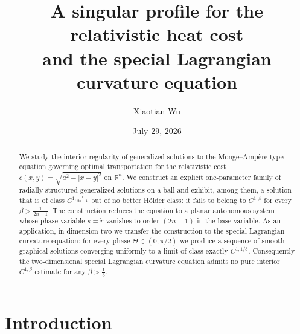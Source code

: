 \documentclass[12pt,letterpaper]{amsart}
\title[]{A singular profile for the relativistic heat cost\\ and the special Lagrangian curvature equation}
\author{Xiaotian Wu}
\date{July 29, 2026}
\theoremstyle{definition}
\theoremstyle{plain}
\numberwithin{equation}{section}
\newcommand{\R}{\mathbb{R}}
\begin{document}
%
%

\begin{abstract}
We study the interior regularity of generalized solutions to the Monge--Amp\`ere type
equation governing optimal transportation for the relativistic cost
$c(x,y)=\sqrt{a^2-|x-y|^2}$ on $\R^n$.
We construct an explicit one-parameter family of radially structured generalized solutions on a ball and exhibit, among them, a solution that is of class
$C^{1,\frac{1}{2n-1}}$ but of no better H\"older class: it fails to belong to
$C^{1,\beta}$ for every $\beta>\frac{1}{2n-1}$.
The construction reduces the equation to a planar autonomous system whose phase variable
$s=\dot r$ vanishes to order $(2n-1)$ in the base variable.
As an application, in dimension two we transfer the construction to the special Lagrangian
curvature equation: for every phase $\Theta\in(0,\pi/2)$ we produce a sequence of smooth
graphical solutions converging uniformly to a limit of class exactly $C^{1,1/3}$.
Consequently the two-dimensional special Lagrangian curvature equation admits no pure
interior $C^{1,\beta}$ estimate for any $\beta>\frac{1}{3}$.
\end{abstract}
\maketitle

\baselineskip16pt
\parskip3pt



\section{Introduction}
\end{document}
